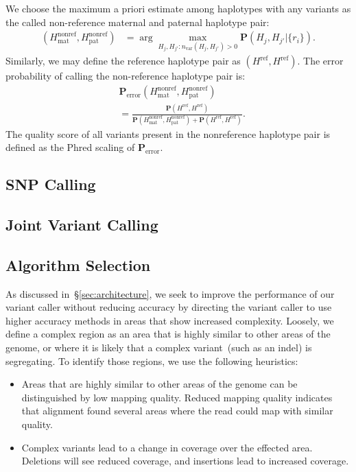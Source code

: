 \documentclass{acm_proc_article-sp}
\begin{document}
We choose the maximum a priori estimate among haplotypes with any variants
as the called non-reference maternal and paternal haplotype pair:
\begin{align}
  (H_\text{mat}^\text{nonref},H_\text{pat}^\text{nonref})&=\arg\max_{H_j,H_{j'}:n_\text{var}(H_j,H_{j'})>0}\mathbf P(H_j,H_{j'}|\{r_i\}).
\end{align}
Similarly, we may define the reference haplotype pair as
$(H^\text{ref},H^\text{ref})$.
The error probability of calling the non-reference haplotype pair is:
\begin{align}
  &\mathbf P_\text{error}(H_\text{mat}^\text{nonref},H_\text{pat}^\text{nonref}) \\ \nonumber
  &=\frac{\mathbf P(H^\text{ref},H^\text{ref})}{\mathbf P(H_\text{mat}^\text{nonref},H_\text{pat}^\text{nonref})+\mathbf P(H^\text{ref},H^\text{ref})}.
\end{align}
The quality score of all variants present in the nonreference haplotype pair
is defined as the Phred scaling of $\mathbf P_\text{error}$.

\subsection{SNP Calling}
\label{sec:snp-calling}


\subsection{Joint Variant Calling}
\label{sec:joint-variant-calling}


\subsection{Algorithm Selection}
\label{sec:algorithm-selection}


As discussed in~\S\ref{sec:architecture}, we seek to improve the performance of our variant caller without reducing accuracy by directing
the variant caller to use higher accuracy methods in areas that show increased complexity. Loosely, we define a complex region as an
area that is highly similar to other areas of the genome, or where it is likely that a complex variant~(such as an indel) is segregating. To
identify those regions, we use the following heuristics:

\begin{itemize}
\item Areas that are highly similar to other areas of the genome can be distinguished by low mapping quality. Reduced mapping quality
indicates that alignment found several areas where the read could map with similar quality.
\item Complex variants lead to a change in coverage over the effected area. Deletions will see reduced coverage, and insertions lead
to increased coverage.
\end{itemize}
\end{document}
